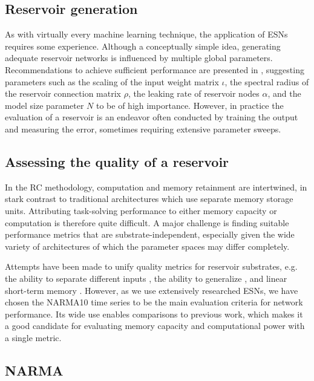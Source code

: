 \subsection{Reservoir generation}

As with virtually every machine learning technique, the application of ESNs
requires some experience. Although a conceptually simple idea, generating
adequate reservoir networks is influenced by multiple global
parameters. Recommendations to achieve sufficient performance are presented in
\cite{montavon_practical_2012, jaeger_tutorial_nodate}, suggesting parameters
such as the scaling of the input weight matrix $\iota$, the spectral radius of
the reservoir connection matrix $\rho$, the leaking rate of reservoir nodes
$\alpha$, and the model size parameter $N$ to be of high importance. However, in
practice the evaluation of a reservoir is an endeavor often conducted by
training the output and measuring the error, sometimes requiring extensive
parameter sweeps.


\subsection{Assessing the quality of a reservoir}

In the RC methodology, computation and memory retainment are intertwined, in
stark contrast to traditional architectures which use separate memory storage
units. Attributing task-solving performance to either memory capacity or
computation is therefore quite difficult. A major challenge is finding suitable
performance metrics that are substrate-independent, especially given the wide
variety of architectures of which the parameter spaces may differ completely.

Attempts have been made to unify quality metrics for reservoir substrates,
e.g. the ability to separate different inputs \cite{legenstein_edge_2007}, the
ability to generalize \cite{legenstein_edge_2007}, and linear short-term memory
\cite{jaeger_short_2002}. However, as we use extensively researched ESNs, we
have chosen the NARMA10 time series to be the main evaluation criteria for
network performance. Its wide use enables comparisons to previous work, which
makes it a good candidate for evaluating memory capacity and computational power
with a single metric.

\subsection{NARMA}

